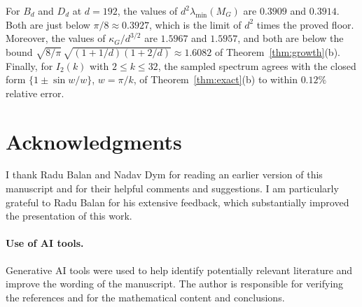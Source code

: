 \documentclass[11pt]{article}
\theoremstyle{definition}
\begin{document}
For $B_d$ and $D_d$ at $d=192$, the values of $d^2\lambda_{\min}(M_G)$ are $0.3909$ and $0.3914$. Both are just below $\pi/8\approx0.3927$, which is the limit of $d^2$ times the proved floor. Moreover, the values of $\kappa_G/d^{3/2}$ are $1.5967$ and $1.5957$, and both are below the bound $\sqrt{8/\pi}\,\sqrt{(1+1/d)(1+2/d)}\approx1.6082$ of Theorem~\ref{thm:growth}(b). Finally, for $I_2(k)$ with $2\le k\le32$, the sampled spectrum agrees with the closed form $\{1\pm\sin w/w\}$, $w=\pi/k$, of Theorem~\ref{thm:exact}(b) to within $0.12\%$ relative error.
\FloatBarrier

\section*{Acknowledgments}

I thank Radu Balan and Nadav Dym for reading an earlier version of this manuscript and for their helpful comments and suggestions. I am particularly grateful to Radu Balan for his extensive feedback, which substantially improved the presentation of this work.

\paragraph{Use of AI tools.}
Generative AI tools were used to help identify potentially relevant literature and improve the wording of the manuscript. The author is responsible for verifying the references and for the mathematical content and conclusions.

\printbibliography
\end{document}
